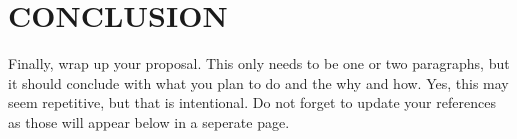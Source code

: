 \documentclass[12pt]{article}
\begin{document}


\section{CONCLUSION}
Finally, wrap up your proposal. This only needs to be one or two paragraphs, but it should conclude with what you plan to do and the why and how. Yes, this may seem repetitive, 
but that is intentional. Do not forget to update your references as those will appear below in a seperate page.
















\newpage
\printbibliography[heading=subbibintoc]
%
%
\end{document}
